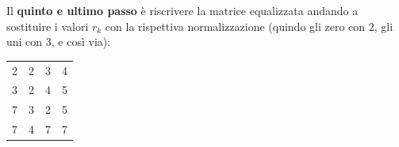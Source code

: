 \documentclass[a4paper]{article}
\begin{document}
	\noindent
	Il \textbf{quinto e ultimo passo} è riscrivere la matrice equalizzata andando a sostituire i valori $r_{k}$ con la rispettiva normalizzazione (quindo gli zero con $2$, gli uni con $3$, e così via):
	\begin{table}[!htbp]
		\centering
		\begin{tabular}{@{} c | c | c | c @{}}
			\toprule
			2 & 2 & 3 & 4 \\
			3 & 2 & 4 & 5 \\
			7 & 3 & 2 & 5 \\
			7 & 4 & 7 & 7 \\
			\bottomrule
		\end{tabular}
	\end{table}
\end{document}
